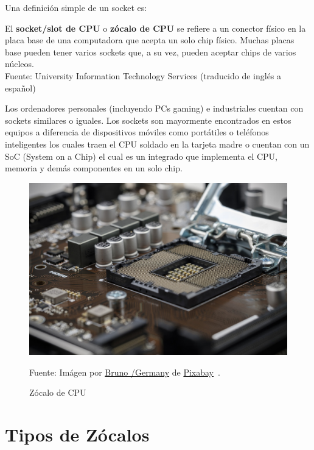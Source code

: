 \documentclass[conference]{IEEEtran}
\begin{document}
    Una definición simple de un socket es:

    \begin{displayquote}
        El \textbf{socket/slot de CPU} o \textbf{zócalo de CPU} se refiere a
        un conector físico en la placa base de una computadora que acepta un
        solo chip físico. Muchas placas base pueden tener varios sockets que,
        a su vez, pueden aceptar chips de varios núcleos.\\
        \small Fuente: University Information Technology Services (traducido
        de inglés a español)~\cite{university-information-technology-services-2019}
    \end{displayquote}

    Los ordenadores personales (incluyendo PCs gaming) e industriales cuentan
    con sockets similares o iguales. Los sockets son mayormente encontrados
    en estos equipos a diferencia de dispositivos móviles como portátiles o
    teléfonos inteligentes los cuales traen el CPU soldado en la tarjeta
    madre o cuentan con un SoC (System on a Chip) el cual es un integrado que
    implementa el CPU, memoria y demás componentes en un solo chip.

    \begin{figure}[H]
        \centering
        \includegraphics[width=0.3\paperwidth]{images/cpu-socket}
        \caption{Zócalo de CPU} \footnotesize
        Fuente: Imágen por \href{https://pixabay.com/users/bru-no-1161770}{Bruno /Germany} de \href{https://pixabay.com}{Pixabay}~\cite{pixabay-cpu-socket-2019}.\label{fig:figure}
    \end{figure}

    \section{Tipos de Zócalos}\label{sec:tipos-de-zócalos}
\end{document}
